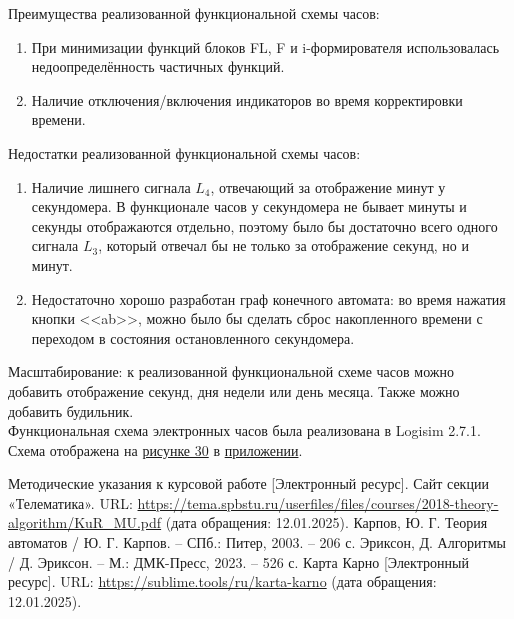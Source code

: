 \documentclass[10pt,a4paper,final]{article} %
\begin{document}
\noindent Преимущества реализованной функциональной схемы часов:
\begin{enumerate}
	\item При минимизации функций блоков FL, F и i-формирователя использовалась недоопределённость частичных функций.
	\item Наличие отключения/включения индикаторов во время корректировки времени.
\end{enumerate}
Недостатки реализованной функциональной схемы часов:
\begin{enumerate}
	\item Наличие лишнего сигнала $L_4$, отвечающий за отображение минут у секундомера. В функционале часов у секундомера не бывает 
	 минуты и секунды отображаются отдельно, поэтому было бы достаточно всего одного сигнала $L_3$, который отвечал бы не только за отображение секунд, но и минут.
	\item Недостаточно хорошо разработан граф конечного автомата: во время нажатия кнопки <<ab>>, можно было бы сделать сброс накопленного времени с переходом в состояния остановленного секундомера.
\end{enumerate}
Масштабирование: к реализованной функциональной схеме часов можно добавить отображение секунд, дня недели или день месяца. Также можно добавить будильник.\\

\noindent Функциональная схема электронных часов была реализована в Logisim 2.7.1. Схема отображена на \hyperref[func scheme]{рисунке 30} в \hyperref[func scheme]{приложении}.

\newpage
{}

\begin{thebibliography}{0}
	 Методические указания к курсовой работе [Электронный ресурс]. Сайт секции «Телематика». URL: \href{https://tema.spbstu.ru/userfiles/files/courses/2018-theory-algorithm/KuR_MU.pdf}{https://tema.spbstu.ru/userfiles/files/courses/2018-theory-algorithm/KuR\_MU.pdf} (дата обращения: 12.01.2025).
	 Карпов, Ю. Г. Теория автоматов / Ю. Г. Карпов. – СПб.: Питер, 2003. – 206 с.
	 Эриксон, Д. Алгоритмы / Д. Эриксон. – М.: ДМК-Пресс, 2023. – 526 с.
	 Карта Карно [Электронный ресурс]. URL: \href{https://sublime.tools/ru/karta-karno}{https://sublime.tools/ru/karta-karno} (дата обращения: 12.01.2025).
\end{thebibliography}

\newpage
{} 
{}
\label {func scheme}

\end{document}
